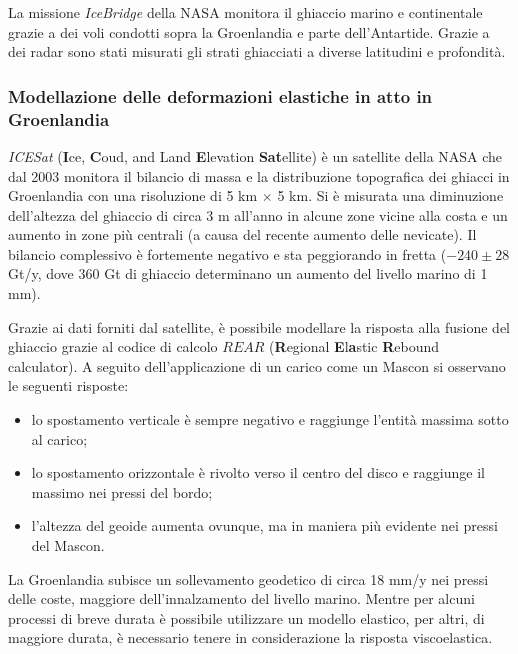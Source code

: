 \documentclass[a4paper,12pt]{book}
\begin{document}
La missione \textit{IceBridge} della NASA monitora il ghiaccio marino e continentale grazie a dei voli condotti sopra la Groenlandia e parte dell'Antartide.
Grazie a dei radar sono stati misurati gli strati ghiacciati a diverse latitudini e profondità.

\subsubsection{\textcolor{colore2}{Modellazione delle deformazioni elastiche in atto in Groenlandia}}

\textit{ICESat} (\textbf{I}ce, \textbf{C}oud, and Land \textbf{E}levation \textbf{Sat}ellite) è un satellite della NASA che dal 2003 monitora il bilancio di massa e la distribuzione topografica dei ghiacci in Groenlandia con una risoluzione di 5 km $\times$ 5 km.
Si è misurata una diminuzione dell'altezza del ghiaccio di circa 3 m all'anno in alcune zone vicine alla costa e un aumento in zone più centrali (a causa del recente aumento delle nevicate).
Il bilancio complessivo è fortemente negativo e sta peggiorando in fretta ($-240 \pm 28$ Gt/y, dove 360 Gt di ghiaccio determinano un aumento del livello marino di 1 mm).

Grazie ai dati forniti dal satellite, è possibile modellare la risposta alla fusione del ghiaccio grazie al codice di calcolo $REAR$ (\textbf{R}egional \textbf{E}l\textbf{a}stic \textbf{R}ebound calculator).
A seguito dell'applicazione di un carico come un Mascon si osservano le seguenti risposte:

\begin{itemize}
    \item lo spostamento verticale è sempre negativo e raggiunge l'entità massima sotto al carico;
    \item lo spostamento orizzontale è rivolto verso il centro del disco e raggiunge il massimo nei pressi del bordo;
    \item l'altezza del geoide aumenta ovunque, ma in maniera più evidente nei pressi del Mascon.
\end{itemize}

La Groenlandia subisce un sollevamento geodetico di circa 18 mm/y nei pressi delle coste, maggiore dell'innalzamento del livello marino.
Mentre per alcuni processi di breve durata è possibile utilizzare un modello elastico, per altri, di maggiore durata, è necessario tenere in considerazione la risposta viscoelastica.

\newpage
\end{document}
